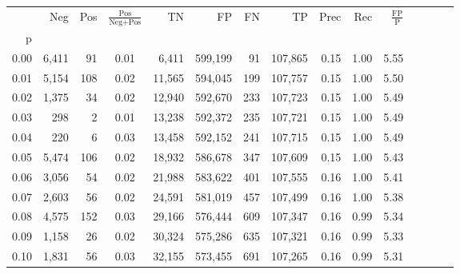 \begin{tabular}{rrrcrrrrrrrrrrr}
\toprule
{} &     Neg &    Pos & $\frac{\text{Pos}}{\text{Neg}+\text{Pos}}$ &       TN &       FP &       FN &       TP &  Prec &   Rec & $\frac{\text{FP}}{\text{P}}$ \\
p    &         &        &                                            &          &          &          &          &       &       &                              \\
\midrule
0.00 &   6,411 &     91 &                                       0.01 &    6,411 &  599,199 &       91 &  107,865 &  0.15 &  1.00 &                         5.55 \\
0.01 &   5,154 &    108 &                                       0.02 &   11,565 &  594,045 &      199 &  107,757 &  0.15 &  1.00 &                         5.50 \\
0.02 &   1,375 &     34 &                                       0.02 &   12,940 &  592,670 &      233 &  107,723 &  0.15 &  1.00 &                         5.49 \\
0.03 &     298 &      2 &                                       0.01 &   13,238 &  592,372 &      235 &  107,721 &  0.15 &  1.00 &                         5.49 \\
0.04 &     220 &      6 &                                       0.03 &   13,458 &  592,152 &      241 &  107,715 &  0.15 &  1.00 &                         5.49 \\
0.05 &   5,474 &    106 &                                       0.02 &   18,932 &  586,678 &      347 &  107,609 &  0.15 &  1.00 &                         5.43 \\
0.06 &   3,056 &     54 &                                       0.02 &   21,988 &  583,622 &      401 &  107,555 &  0.16 &  1.00 &                         5.41 \\
0.07 &   2,603 &     56 &                                       0.02 &   24,591 &  581,019 &      457 &  107,499 &  0.16 &  1.00 &                         5.38 \\
0.08 &   4,575 &    152 &                                       0.03 &   29,166 &  576,444 &      609 &  107,347 &  0.16 &  0.99 &                         5.34 \\
0.09 &   1,158 &     26 &                                       0.02 &   30,324 &  575,286 &      635 &  107,321 &  0.16 &  0.99 &                         5.33 \\
0.10 &   1,831 &     56 &                                       0.03 &   32,155 &  573,455 &      691 &  107,265 &  0.16 &  0.99 &                         5.31 \\

\end{tabular}

